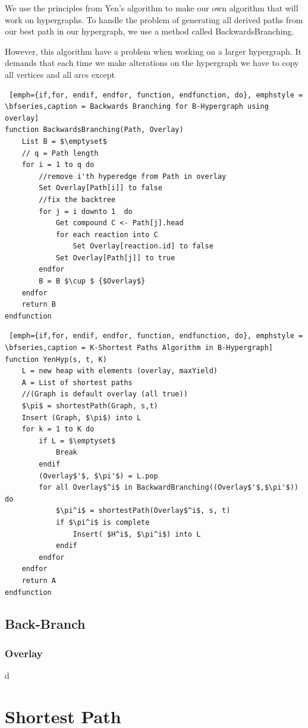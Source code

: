 \documentclass[a4paper,10pt,titlepage]{paper}
\begin{document}
We use the principles from Yen's algorithm to make our own algorithm that will work on hypergraphs. To handle the problem of generating all derived paths from our best path in our hypergraph, we use a method called BackwardsBranching.\cite{Nielsen} 

However, this algorithm have a problem when working on a larger hypergraph. It demands that each time we make alterations on the hypergraph we have to copy all vertices and all arcs except

\begin{lstlisting} [emph={if,for, endif, endfor, function, endfunction, do}, emphstyle = \bfseries,caption = Backwards Branching for B-Hypergraph using overlay]
function BackwardsBranching(Path, Overlay) 						
	List B = $\emptyset$
	// q = Path length
	for i = 1 to q do			
		//remove i'th hyperedge from Path in overlay					
		Set Overlay[Path[i]] to false		
		//fix the backtree				
		for j = i downto 1	do							
			Get compound C <- Path[j].head
			for each reaction into C
				Set Overlay[reaction.id] to false
			Set Overlay[Path[j]] to true
		endfor
		B = B $\cup $ {$Overlay$}
	endfor
	return B
endfunction
\end{lstlisting}

\begin{lstlisting} [emph={if,for, endif, endfor, function, endfunction, do}, emphstyle = \bfseries,caption = K-Shortest Paths Algorithm in B-Hypergraph]
function YenHyp(s, t, K) 
	L = new heap with elements (overlay, maxYield)
	A = List of shortest paths
	//(Graph is default overlay (all true))
	$\pi$ = shortestPath(Graph, s,t) 				
	Insert (Graph, $\pi$) into L
	for k = 1 to K do
		if L = $\emptyset$
			Break
		endif
		(Overlay$'$, $\pi'$) = L.pop
		for all Overlay$^i$ in BackwardBranching((Overlay$'$,$\pi'$)) do
			$\pi^i$ = shortestPath(Overlay$^i$, s, t)
			if $\pi^i$ is complete
				Insert( $H^i$, $\pi^i$) into L
			endif
		endfor
	endfor
	return A
endfunction
\end{lstlisting}

\subsection{Back-Branch}
\subsubsection{Overlay}
d\cite{VectorBool}

\section{Shortest Path}
\end{document}
